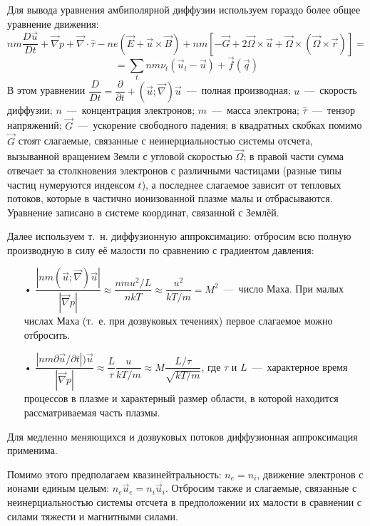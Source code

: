 \documentclass[14pt, a4paper, fleqn]{extarticle}
\begin{document}
Для вывода уравнения амбиполярной диффузии используем гораздо более общее уравнение движения: $$nm\dfrac{D\vec{u}}{Dt}+\vec{\nabla} p + \vec{\nabla}\cdot \hat{\tau} - ne(\vec{E}+\vec{u}\times \vec{B})+nm[-\vec{G}+2\vec{\Omega}\times \vec{u}+\vec{\Omega}\times(\vec{\Omega}\times\vec{r})]=$$
$$=\sum_t nm\nu_t (\vec{u}_t-\vec{u})+ \vec{f}(\vec{q})$$
В этом уравнении $\dfrac{D}{Dt}=\dfrac{\partial}{\partial t}+(\vec{u}; \vec{\nabla})\vec{u}$~---~полная производная; $u$~---~скорость диффузии; $n$~---~концентрация электронов; $m$~---~масса электрона; $\hat{\tau}$~---~тензор напряжений; $\vec{G}$~---~ускорение свободного падения; в квадратных скобках помимо $\vec{G}$ стоят слагаемые, связанные с неинерциальностью системы отсчета, вызыванной вращением Земли с угловой скоростью $\vec{\Omega}$; в правой части сумма отвечает за столкновения электронов с различными частицами (разные типы частиц нумеруются индексом $t$), а последнее слагаемое зависит от тепловых потоков, которые в частично ионизованной плазме малы и отбрасываются. Уравнение записано в системе координат, связанной с Землёй.

\bigskip

Далее используем т.~н. диффузионную аппроксимацию: отбросим всю полную производную в силу её малости по сравнению с градиентом давления:

\begin{itemize}

\item[•] $\dfrac{|nm(\vec{u}; \vec{\nabla})\vec{u}|}{|\vec{\nabla}p|}\approx \dfrac{nmu^2/L}{nkT}\approx \dfrac{u^2}{kT/m}=M^2$~---~число Маха. При малых числах Маха (т.~е. при дозвуковых течениях) первое слагаемое можно отбросить.

\item[•] $\dfrac{|nm\partial\vec{u}/\partial t|)\vec{u}}{|\vec{\nabla}p|}\approx \dfrac{L}{\tau} \dfrac{u}{kT/m}\approx M\dfrac{L/\tau}{\sqrt{kT/m}}$, где $\tau$ и $L$~---~характерное время процессов в плазме и характерный размер области, в которой находится рассматриваемая часть плазмы.

\end{itemize}

Для медленно меняющихся и дозвуковых потоков диффузионная аппроксимация применима.

\bigskip

Помимо этого предполагаем квазинейтральность: $n_e=n_i$, движение электронов с ионами единым целым: $n_e \vec{u}_e=n_i \vec{u}_i$. Отбросим также и слагаемые, связанные с неинерциальностью системы отсчета в предположении их малости в сравнении с силами тяжести и магнитными силами.
\end{document}
